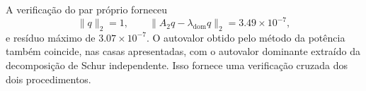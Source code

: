 A verificação do par próprio forneceu
\[
\|q\|_2=1,\qquad
\|A_2q-\lambda_{\mathrm{dom}}q\|_2
=3.49\times10^{-7},
\]
e resíduo máximo de \(3.07\times10^{-7}\). O autovalor obtido pelo método da potência também coincide, nas casas apresentadas, com o autovalor dominante extraído da decomposição de Schur independente. Isso fornece uma verificação cruzada dos dois procedimentos.
